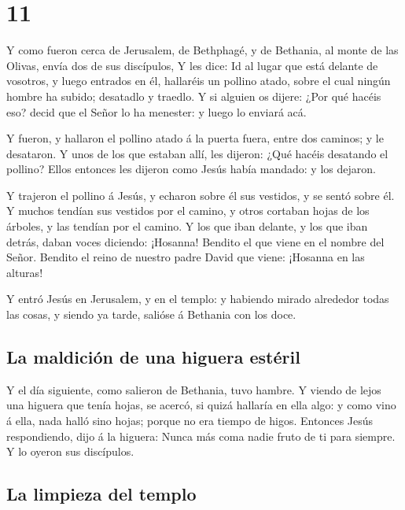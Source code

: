 \hypertarget{section-10}{%
\section{11}\label{section-10}}

 Y como fueron cerca de Jerusalem, de Bethphagé, y de
Bethania, al monte de las Olivas, envía dos de sus discípulos,
 Y les dice: Id al lugar que está delante de vosotros, y
luego entrados en él, hallaréis un pollino atado, sobre el cual ningún
hombre ha subido; desatadlo y traedlo.  Y si alguien os
dijere: ¿Por qué hacéis eso? decid que el Señor lo ha menester: y luego
lo enviará acá.

 Y fueron, y hallaron el pollino atado á la puerta fuera,
entre dos caminos; y le desataron.  Y unos de los que
estaban allí, les dijeron: ¿Qué hacéis desatando el pollino?
 Ellos entonces les dijeron como Jesús había mandado: y
los dejaron.

 Y trajeron el pollino á Jesús, y echaron sobre él sus
vestidos, y se sentó sobre él.  Y muchos tendían sus
vestidos por el camino, y otros cortaban hojas de los árboles, y las
tendían por el camino.  Y los que iban delante, y los que
iban detrás, daban voces diciendo: ¡Hosanna! Bendito el que viene en el
nombre del Señor.  Bendito el reino de nuestro padre
David que viene: ¡Hosanna en las alturas!

 Y entró Jesús en Jerusalem, y en el templo: y habiendo
mirado alrededor todas las cosas, y siendo ya tarde, salióse á Bethania
con los doce.

\hypertarget{la-maldiciuxf3n-de-una-higuera-estuxe9ril}{%
\subsection{La maldición de una higuera
estéril}\label{la-maldiciuxf3n-de-una-higuera-estuxe9ril}}

 Y el día siguiente, como salieron de Bethania, tuvo
hambre.  Y viendo de lejos una higuera que tenía hojas,
se acercó, si quizá hallaría en ella algo: y como vino á ella, nada
halló sino hojas; porque no era tiempo de higos. 
Entonces Jesús respondiendo, dijo á la higuera: Nunca más coma nadie
fruto de ti para siempre. Y lo oyeron sus discípulos.

\hypertarget{la-limpieza-del-templo}{%
\subsection{La limpieza del templo}\label{la-limpieza-del-templo}}


